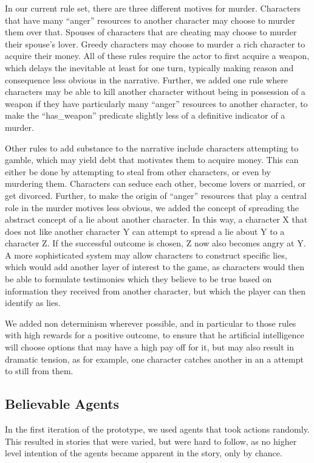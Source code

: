 In our current rule set, there are three different motives for murder. Characters that have many \enquote{anger} resources to another character may choose to murder them over that. Spouses of characters that are cheating may choose to murder their spouse's lover. Greedy characters may choose to murder a rich character to acquire their money. All of these rules require the actor to first acquire a weapon, which delays the inevitable at least for one turn, typically making reason and consequence less obvious in the narrative. Further, we added one rule where characters may be able to kill another character without being in possession of a weapon if they have particularly many \enquote{anger} resources to another character, to make the \enquote{has\_weapon} predicate slightly less of a definitive indicator of a murder.

Other rules to add substance to the narrative include characters attempting to gamble, which may yield debt that motivates them to acquire money. This can either be done by attempting to steal from other characters, or even by murdering them. Characters can seduce each other, become lovers or married, or get divorced. Further, to make the origin of \enquote{anger} resources that play a central role in the murder motives less obvious, we added the concept of spreading the abstract concept of a lie about another character. In this way, a character X that does not like another character Y can attempt to spread a lie about Y to a character Z. If the successful outcome is chosen, Z now also becomes angry at Y. A more sophisticated system may allow characters to construct specific lies, which would add another layer of interest to the game, as characters would then be able to formulate testimonies which they believe to be true based on information they received from another character, but which the player can then identify as lies.

We added non determinism wherever possible, and in particular to those rules with high rewards for a positive outcome, to ensure that he artificial intelligence will choose options that may have a high pay off for it, but may also result in dramatic tension, as for example, one character catches another in an a attempt to still from  them.

\subsection{Believable Agents}
In the first iteration of the prototype, we used agents that took actions randomly. This resulted in stories that were varied, but were hard to follow, as no higher level intention of the agents became apparent in the story, only by chance.

